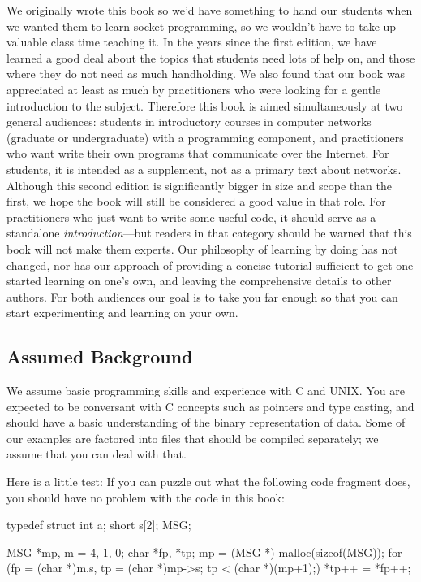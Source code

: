 We originally wrote this book so we'd have something to hand our students
when we wanted them to learn socket programming, so we wouldn't have
to take up valuable class time teaching it.  In the years since
the first edition, we have learned a good deal
about the topics that students need lots of help on, and those where
they do not need as much handholding.  We also found that
our book was appreciated at least as much by practitioners who were
looking for a gentle introduction to the subject.
%
Therefore this book is aimed simultaneously at two general audiences:
students in introductory courses in computer networks (graduate or
undergraduate) with a programming component, and
practitioners who want write their own programs that
communicate over the Internet.
For students, it is intended as a supplement, not as a primary text
about networks.
Although this second edition is significantly bigger in size and scope than
the first, we hope the book will still be considered a good value in
that role.
%
For practitioners who just want to write some useful code, it should
serve as a standalone \emph{introduction}---but readers in that
category should be warned that this book will not make them
experts. 
%
Our philosophy of learning by 
doing has not changed, nor has our approach of providing a concise
tutorial sufficient to get one started learning on one's own, and
leaving the comprehensive details to other authors.
For both audiences our goal is to
take you far enough so that you can start experimenting and
learning on your own.

\subsection*{Assumed Background}

We assume basic programming skills and experience with C and UNIX.
You are expected to be conversant with C concepts such as pointers
and type casting, and should have a basic understanding of
the binary representation of data.  Some of our examples are factored
into files that should be compiled separately; we assume that you can deal with
that.

Here is a little test: If you can puzzle out what the following code
fragment does, you should have no problem with the code in this book:

\begin{inlinecode}
  typedef struct {
    int a;
    short s[2];
  } MSG;

  MSG *mp, m = {4, 1, 0};
  char  *fp, *tp;
  mp = (MSG *) malloc(sizeof(MSG));
  for (fp = (char *)m.s, tp = (char *)mp->s; tp < (char *)(mp+1);)
     *tp++ = *fp++;
\end{inlinecode}

